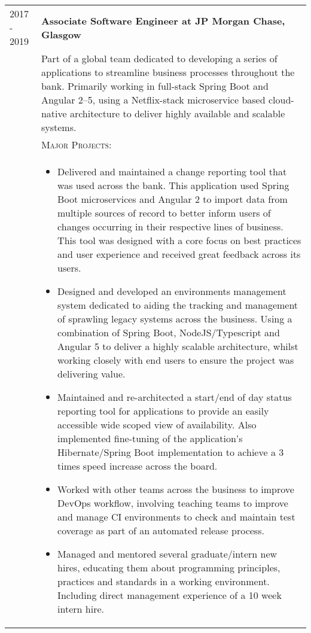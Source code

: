 \begin{tabular}{p{60pt}|p{11cm}}
    \hspace*{\fill}\textsc{2017 - 2019} & \textbf{Associate Software Engineer at JP Morgan Chase, Glasgow} \\

    \hspace*{\fill}& \small{
    Part of a global team dedicated to developing a series of applications to streamline business processes throughout the bank.
    Primarily working in full-stack Spring Boot and Angular 2--5, using a Netflix-stack microservice based cloud-native architecture to deliver highly available and scalable systems.
    } \\

    \ & \vspace{1pt}\textsc{Major Projects}: \\

    &\vspace{-0.9em}\begin{itemize}[itemsep=0pt,topsep=0pt,leftmargin=*]
                        \small
                        \item Delivered and maintained a change reporting tool that was used across the bank.
                        This application used Spring Boot microservices and Angular 2 to import data from multiple sources of record to better inform users of changes occurring in their respective lines of business.
                        This tool was designed with a core focus on best practices and user experience and received great feedback across its users.
    \end{itemize}
    \begin{itemize}[itemsep=0pt,topsep=0pt,leftmargin=*]
        \small
        \item Designed and developed an environments management system dedicated to aiding the tracking and management of sprawling legacy systems across the business.
        Using a combination of Spring Boot, NodeJS/Typescript and Angular 5 to deliver a highly scalable architecture, whilst working closely with end users to ensure the project was delivering value.
        \item Maintained and re-architected a start/end of day status reporting tool for applications to provide an easily accessible wide scoped view of availability.
        Also implemented fine-tuning of the application's Hibernate/Spring Boot implementation to achieve a 3 times speed increase across the board.
        \item Worked with other teams across the business to improve DevOps workflow, involving teaching teams to improve and manage CI environments to check and maintain test coverage as part of an automated release process.
        \item Managed and mentored several graduate/intern new hires, educating them about programming principles, practices and standards in a working environment.
        Including direct management experience of a 10 week intern hire.
    \end{itemize}


\end{tabular}
